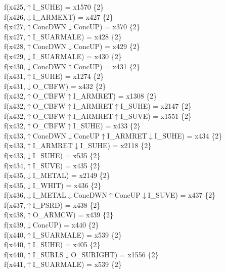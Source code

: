 f(x425,$\uparrow$I\_SUHE) = x1570 \{2\} \\  
f(x426,$\downarrow$I\_ARMEXT) = x427 \{2\} \\  
f(x427,$\uparrow$ConcDWN$\downarrow$ConcUP) = x370 \{2\} \\  
f(x427,$\uparrow$I\_SUARMALE) = x428 \{2\} \\  
f(x428,$\uparrow$ConcDWN$\downarrow$ConcUP) = x429 \{2\} \\  
f(x429,$\downarrow$I\_SUARMALE) = x430 \{2\} \\  
f(x430,$\downarrow$ConcDWN$\uparrow$ConcUP) = x431 \{2\} \\  
f(x431,$\uparrow$I\_SUHE) = x1274 \{2\} \\  
f(x431,$\downarrow$O\_CBFW) = x432 \{2\} \\  
f(x432,$\uparrow$O\_CBFW$\uparrow$I\_ARMRET) = x1308 \{2\} \\  
f(x432,$\uparrow$O\_CBFW$\uparrow$I\_ARMRET$\uparrow$I\_SUHE) = x2147 \{2\} \\  
f(x432,$\uparrow$O\_CBFW$\uparrow$I\_ARMRET$\uparrow$I\_SUVE) = x1551 \{2\} \\  
f(x432,$\uparrow$O\_CBFW$\uparrow$I\_SUHE) = x433 \{2\} \\  
f(x433,$\uparrow$ConcDWN$\downarrow$ConcUP$\uparrow$I\_ARMRET$\downarrow$I\_SUHE) = x434 \{2\} \\  
f(x433,$\uparrow$I\_ARMRET$\downarrow$I\_SUHE) = x2118 \{2\} \\  
f(x433,$\downarrow$I\_SUHE) = x535 \{2\} \\  
f(x434,$\uparrow$I\_SUVE) = x435 \{2\} \\  
f(x435,$\downarrow$I\_METAL) = x2149 \{2\} \\  
f(x435,$\downarrow$I\_WHIT) = x436 \{2\} \\  
f(x436,$\downarrow$I\_METAL$\downarrow$ConcDWN$\uparrow$ConcUP$\downarrow$I\_SUVE) = x437 \{2\} \\  
f(x437,$\uparrow$I\_PSRD) = x438 \{2\} \\  
f(x438,$\uparrow$O\_ARMCW) = x439 \{2\} \\  
f(x439,$\downarrow$ConcUP) = x440 \{2\} \\  
f(x440,$\uparrow$I\_SUARMALE) = x539 \{2\} \\  
f(x440,$\uparrow$I\_SUHE) = x405 \{2\} \\  
f(x440,$\uparrow$I\_SURLS$\downarrow$O\_SURIGHT) = x1556 \{2\} \\  
f(x441,$\uparrow$I\_SUARMALE) = x539 \{2\} \\  
